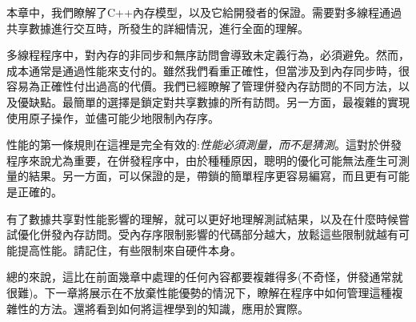 本章中，我們瞭解了C++內存模型，以及它給開發者的保證。需要對多線程通過共享數據進行交互時，所發生的詳細情況，進行全面的理解。

多線程程序中，對內存的非同步和無序訪問會導致未定義行為，必須避免。然而，成本通常是通過性能來支付的。雖然我們看重正確性，但當涉及到內存同步時，很容易為正確性付出過高的代價。我們已經瞭解了管理併發內存訪問的不同方法，以及優缺點。最簡單的選擇是鎖定對共享數據的所有訪問。另一方面，最複雜的實現使用原子操作，並儘可能少地限制內存序。

性能的第一條規則在這裡是完全有效的:\textit{性能必須測量，而不是猜測}。這對於併發程序來說尤為重要，在併發程序中，由於種種原因，聰明的優化可能無法產生可測量的結果。另一方面，可以保證的是，帶鎖的簡單程序更容易編寫，而且更有可能是正確的。

有了數據共享對性能影響的理解，就可以更好地理解測試結果，以及在什麼時候嘗試優化併發內存訪問。受內存序限制影響的代碼部分越大，放鬆這些限制就越有可能提高性能。請記住，有些限制來自硬件本身。

總的來說，這比在前面幾章中處理的任何內容都要複雜得多(不奇怪，併發通常就很難)。下一章將展示在不放棄性能優勢的情況下，瞭解在程序中如何管理這種複雜性的方法。還將看到如何將這裡學到的知識，應用於實際。





